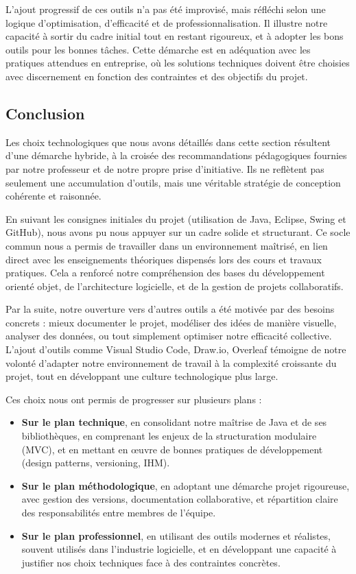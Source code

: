 L’ajout progressif de ces outils n’a pas été improvisé, mais réfléchi selon une logique d’optimisation, d’efficacité et de professionnalisation. Il illustre notre capacité à sortir du cadre initial tout en restant rigoureux, et à adopter les bons outils pour les bonnes tâches. Cette démarche est en adéquation avec les pratiques attendues en entreprise, où les solutions techniques doivent être choisies avec discernement en fonction des contraintes et des objectifs du projet.


\subsection{Conclusion}

Les choix technologiques que nous avons détaillés dans cette section résultent d’une démarche hybride, à la croisée des recommandations pédagogiques fournies par notre professeur et de notre propre prise d’initiative. Ils ne reflètent pas seulement une accumulation d’outils, mais une véritable stratégie de conception cohérente et raisonnée.

En suivant les consignes initiales du projet (utilisation de Java, Eclipse, Swing et GitHub), nous avons pu nous appuyer sur un cadre solide et structurant. Ce socle commun nous a permis de travailler dans un environnement maîtrisé, en lien direct avec les enseignements théoriques dispensés lors des cours et travaux pratiques. Cela a renforcé notre compréhension des bases du développement orienté objet, de l’architecture logicielle, et de la gestion de projets collaboratifs.

Par la suite, notre ouverture vers d’autres outils a été motivée par des besoins concrets : mieux documenter le projet, modéliser des idées de manière visuelle, analyser des données, ou tout simplement optimiser notre efficacité collective. L’ajout d’outils comme Visual Studio Code, Draw.io, Overleaf  témoigne de notre volonté d’adapter notre environnement de travail à la complexité croissante du projet, tout en développant une culture technologique plus large.

Ces choix nous ont permis de progresser sur plusieurs plans :
\begin{itemize}
    \item \textbf{Sur le plan technique}, en consolidant notre maîtrise de Java et de ses bibliothèques, en comprenant les enjeux de la structuration modulaire (MVC), et en mettant en œuvre de bonnes pratiques de développement (design patterns, versioning, IHM).
    \item \textbf{Sur le plan méthodologique}, en adoptant une démarche projet rigoureuse, avec gestion des versions, documentation collaborative, et répartition claire des responsabilités entre membres de l’équipe.
    \item \textbf{Sur le plan professionnel}, en utilisant des outils modernes et réalistes, souvent utilisés dans l’industrie logicielle, et en développant une capacité à justifier nos choix techniques face à des contraintes concrètes.
\end{itemize}

